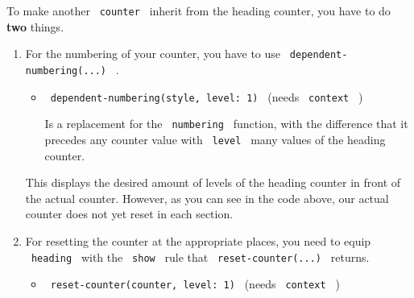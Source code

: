 To make another \texttt{\ counter\ } inherit from the heading counter,
you have to do \textbf{two} things.

\begin{enumerate}
\item
  For the numbering of your counter, you have to use
  \texttt{\ dependent-numbering(...)\ } .

  \begin{itemize}
  \item
    \texttt{\ dependent-numbering(style,\ level:\ 1)\ } (needs
    \texttt{\ context\ } )

    Is a replacement for the \texttt{\ numbering\ } function, with the
    difference that it precedes any counter value with
    \texttt{\ level\ } many values of the heading counter.
  \end{itemize}

\begin{Shaded}
\begin{Highlighting}[]







\end{Highlighting}
\end{Shaded}

  This displays the desired amount of levels of the heading counter in
  front of the actual counter. However, as you can see in the code
  above, our actual counter does not yet reset in each section.
\item
  For resetting the counter at the appropriate places, you need to equip
  \texttt{\ heading\ } with the \texttt{\ show\ } rule that
  \texttt{\ reset-counter(...)\ } returns.

  \begin{itemize}
  \item
    \texttt{\ reset-counter(counter,\ level:\ 1)\ } (needs
    \texttt{\ context\ } )


\end{itemize}
\end{enumerate}
